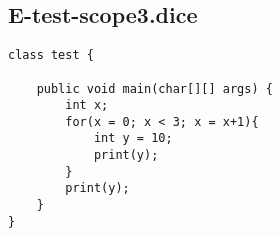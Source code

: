 \subsection{E-test-scope3.dice}
\begin{verbatim}
class test {

	public void main(char[][] args) {
		int x;
		for(x = 0; x < 3; x = x+1){
			int y = 10;
			print(y);
		}
		print(y);
	}
}
\end{verbatim}